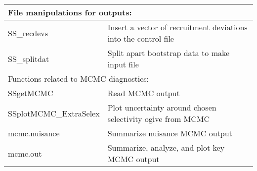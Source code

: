 \begin{center}
\begin{longtable}{p{4.5cm} p{10.52cm}}
		\multicolumn{2}{l}{File manipulations for outputs:}\Tstrut\Bstrut\\
		\hline
		SS\_recdevs  \Tstrut & Insert a vector of recruitment deviations into the control file \\
		SS\_splitdat \Tstrut & Split apart bootstrap data to make input file \Bstrut\\
		\hline
		
		\multicolumn{2}{l}{Functions related to MCMC diagnostics:}\Tstrut\Bstrut\\
		\hline
		SSgetMCMC      \Tstrut & Read MCMC output \\
		SSplotMCMC\_ExtraSelex \Tstrut & Plot uncertainty around chosen selectivity ogive from MCMC \\
		mcmc.nuisance \Tstrut & Summarize nuisance MCMC output \\
		mcmc.out      \Tstrut & Summarize, analyze, and plot key MCMC output \Bstrut\\
		\hline
				
%
		

\end{longtable}
\end{center}
